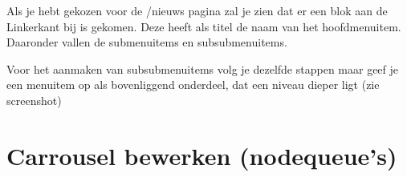 Als je hebt gekozen voor de /nieuws pagina zal je zien dat er een blok aan de Linkerkant bij is gekomen. Deze heeft als titel de naam van het hoofdmenuitem. Daaronder vallen de submenuitems en subsubmenuitems.

Voor het aanmaken van subsubmenuitems volg je dezelfde stappen maar geef je een menuitem op als bovenliggend onderdeel, dat een niveau dieper ligt (zie screenshot)
\begin{center}
\end{center}

\section{Carrousel bewerken (nodequeue's)}

